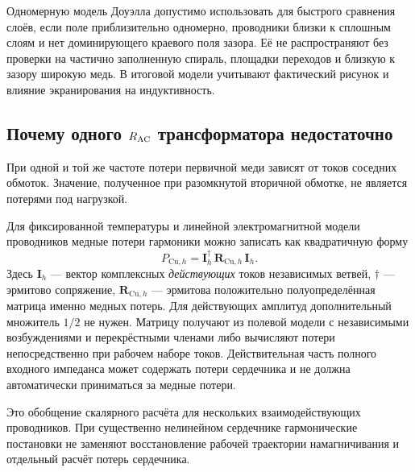 \documentclass[14pt,a4paper]{extarticle}
\begin{document}
Одномерную модель Доуэлла допустимо использовать для быстрого сравнения слоёв, если поле приблизительно одномерно, проводники близки к сплошным слоям и нет доминирующего краевого поля зазора. Её не распространяют без проверки на частично заполненную спираль, площадки переходов и близкую к зазору широкую медь. В итоговой модели учитывают фактический рисунок и влияние экранирования на индуктивность.

\subsection{Почему одного $R_{\rm AC}$ трансформатора недостаточно}
При одной и той же частоте потери первичной меди зависят от токов соседних обмоток. Значение, полученное при разомкнутой вторичной обмотке, не является потерями под нагрузкой.

Для фиксированной температуры и линейной электромагнитной модели проводников медные потери гармоники можно записать как квадратичную форму
\begin{equation}
 P_{\mathrm{Cu},h}=\mathbf I_h^{\dagger}\,\mathbf R_{\mathrm{Cu},h}\,\mathbf I_h .
 \label{pl:eq:loss-matrix}
\end{equation}
Здесь $\mathbf I_h$ --- вектор комплексных \emph{действующих} токов независимых ветвей, $\dagger$ --- эрмитово сопряжение, $\mathbf R_{\mathrm{Cu},h}$ --- эрмитова положительно полуопределённая матрица именно медных потерь. Для действующих амплитуд дополнительный множитель $1/2$ не нужен. Матрицу получают из полевой модели с независимыми возбуждениями и перекрёстными членами либо вычисляют потери непосредственно при рабочем наборе токов. Действительная часть полного входного импеданса может содержать потери сердечника и не должна автоматически приниматься за медные потери.

Это обобщение скалярного расчёта для нескольких взаимодействующих проводников. При существенно нелинейном сердечнике гармонические постановки не заменяют восстановление рабочей траектории намагничивания и отдельный расчёт потерь сердечника.
\end{document}
